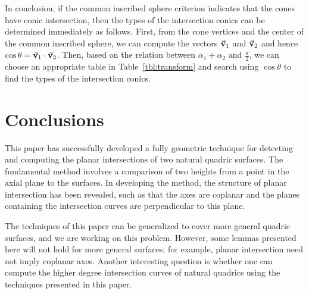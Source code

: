 In conclusion,
if  the common inscribed sphere criterion indicates that the cones have
conic intersection, then the types of the intersection conics can be
determined immediately as follows.
First, from the cone vertices and the center of the
common inscribed sphere, we can compute the vectors $\vec{\bf v}_1$ and
$\vec{\bf v}_2$ and hence
$\cos\theta=\vec{\bf v}_1\cdot\vec{\bf v}_2$.  Then, based on
the relation between $\alpha_1+\alpha_2$ and $\frac{\pi}{2}$,
we can choose an appropriate
table in Table~\ref{tbl:transform} and search using $\cos\theta$
to find the types of the intersection conics.



%

\section{Conclusions}
\label{section:conclusion}

     This paper has successfully developed a fully geometric technique for
detecting and computing the planar intersections of two natural quadric
surfaces.  The fundamental method involves a comparison of two heights from a
point in the axial plane to the surfaces.  In developing the method, the
structure of planar intersection has been revealed, such as that the axes are
coplanar and the planes containing the intersection curves are perpendicular
to this plane.

     The techniques of this paper can be generalized to cover more general
quadric surfaces, and we are working on this problem.   However, some lemmas
presented here will not hold for more general surfaces; for example, planar
intersection need not imply coplanar axes.  Another interesting question is
whether one can compute the higher degree intersection curves of natural
quadrics using the techniques presented in this paper.




